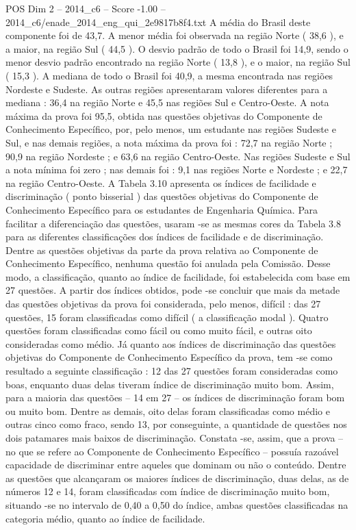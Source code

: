 \begin{textsample}{POS Dim 2 – 2014\_c6 – Score -1.00 – 2014\_c6/enade\_2014\_eng\_qui\_2e9817b8f4.txt}
A média do Brasil deste componente foi de 43,7.
A menor média foi observada na região Norte ( 38,6 ), e a maior, na região Sul ( 44,5 ).
O desvio padrão de todo o Brasil foi 14,9, sendo o menor desvio padrão encontrado na região Norte ( 13,8 ), e o maior, na região Sul ( 15,3 ).
A mediana de todo o Brasil foi 40,9, a mesma encontrada nas regiões Nordeste e Sudeste.
As outras regiões apresentaram valores diferentes para a mediana : 36,4 na região Norte e 45,5 nas regiões Sul e Centro-Oeste.
A nota máxima da prova foi 95,5, obtida nas questões objetivas do Componente de Conhecimento Específico, por, pelo menos, um estudante nas regiões Sudeste e Sul, e nas demais regiões, a nota máxima da prova foi : 72,7 na região Norte ; 90,9 na região Nordeste ; e 63,6 na região Centro-Oeste.
Nas regiões Sudeste e Sul a nota mínima foi zero ; nas demais foi : 9,1 nas regiões Norte e Nordeste ; e 22,7 na região Centro-Oeste.
A Tabela 3.10 apresenta os índices de facilidade e discriminação ( ponto bisserial ) das questões objetivas do Componente de Conhecimento Específico para os estudantes de Engenharia Química.
Para facilitar a diferenciação das questões, usaram -se as mesmas cores da Tabela 3.8 para as diferentes classificações dos índices de facilidade e de discriminação.
Dentre as questões objetivas da parte da prova relativa ao Componente de Conhecimento Específico, nenhuma questão foi anulada pela Comissão.
Desse modo, a classificação, quanto ao índice de facilidade, foi estabelecida com base em 27 questões.
A partir dos índices obtidos, pode -se concluir que mais da metade das questões objetivas da prova foi considerada, pelo menos, difícil : das 27 questões, 15 foram classificadas como difícil ( a classificação modal ).
Quatro questões foram classificadas como fácil ou como muito fácil, e outras oito consideradas como médio.
Já quanto aos índices de discriminação das questões objetivas do Componente de Conhecimento Específico da prova, tem -se como resultado a seguinte classificação : 12 das 27 questões foram consideradas como boas, enquanto duas delas tiveram índice de discriminação muito bom.
Assim, para a maioria das questões – 14 em 27 – os índices de discriminação foram bom ou muito bom.
Dentre as demais, oito delas foram classificadas como médio e outras cinco como fraco, sendo 13, por conseguinte, a quantidade de questões nos dois patamares mais baixos de discriminação.
Constata -se, assim, que a prova – no que se refere ao Componente de Conhecimento Específico – possuía razoável capacidade de discriminar entre aqueles que dominam ou não o conteúdo.
Dentre as questões que alcançaram os maiores índices de discriminação, duas delas, as de números 12 e 14, foram classificadas com índice de discriminação muito bom, situando -se no intervalo de 0,40 a 0,50 do índice, ambas questões classificadas na categoria médio, quanto ao índice de facilidade.

\end{textsample}
